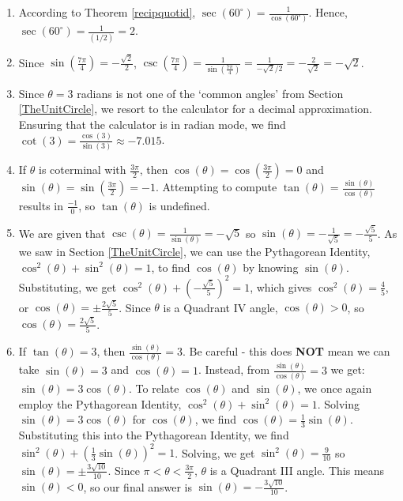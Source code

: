 {
\begin{enumerate}

\item  According to Theorem \ref{recipquotid},   $\sec\left(60^{\circ}\right) = \frac{1}{\cos\left(60^{\circ}\right)}$. Hence,  $\sec\left(60^{\circ}\right) = \frac{1}{(1/2)} = 2$.

\item  Since $\sin\left( \frac{7\pi}{4}\right) = - \frac{\sqrt{2}}{2}$,  $\csc\left( \frac{7\pi}{4}\right) = \frac{1}{\sin\left( \frac{7\pi}{4}\right)} = \frac{1}{- \sqrt{2}/2} = - \frac{2}{\sqrt{2}} = - \sqrt{2}$.

\item  Since $\theta = 3$ radians is not one of the `common angles' from Section \ref{TheUnitCircle}, we resort to the calculator for a decimal approximation.  Ensuring that the calculator is in radian mode, we find $\cot(3) = \frac{\cos(3)}{\sin(3)} \approx -7.015$.

\item  If $\theta$ is coterminal with $\frac{3 \pi}{2}$, then $\cos(\theta) = \cos\left(\frac{3 \pi}{2}\right) = 0$ and $\sin(\theta) = \sin\left(\frac{3 \pi}{2}\right) = -1$.  Attempting to compute $\tan(\theta) = \frac{\sin(\theta)}{\cos(\theta)}$ results in $\frac{-1}{0}$, so $\tan(\theta)$ is undefined.

\item  We are given that $\csc(\theta) = \frac{1}{\sin(\theta)} = -\sqrt{5}$ so $\sin(\theta) = -\frac{1}{\sqrt{5}} = -\frac{\sqrt{5}}{5}$.  As we saw in Section \ref{TheUnitCircle}, we can use the Pythagorean Identity, $\cos^{2}(\theta) + \sin^2(\theta) = 1$, to find $\cos(\theta)$ by knowing $\sin(\theta)$.  Substituting, we get $\cos^{2}(\theta) + \left(-\frac{\sqrt{5}}{5}\right)^2 = 1$, which gives $\cos^{2}(\theta) = \frac{4}{5}$, or $\cos(\theta) = \pm \frac{2 \sqrt{5}}{5}$.  Since $\theta$ is a Quadrant IV angle, $\cos(\theta) > 0$, so $\cos(\theta) = \frac{2 \sqrt{5}}{5}$.

\item \label{commontanmistake} If $\tan(\theta) = 3$, then $\frac{\sin(\theta)}{\cos(\theta)} = 3$.  Be careful - this does \textbf{NOT} mean we can take $\sin(\theta) = 3$ and $\cos(\theta) = 1$. Instead, from $\frac{\sin(\theta)}{\cos(\theta)} = 3$  we get: $\sin(\theta) = 3 \cos(\theta)$.  To relate $\cos(\theta)$ and $\sin(\theta)$, we once again employ the Pythagorean Identity, $\cos^{2}(\theta) + \sin^{2}(\theta) = 1$.  Solving $\sin(\theta) = 3 \cos(\theta)$ for $\cos(\theta)$, we find $\cos(\theta) = \frac{1}{3} \sin(\theta)$.  Substituting this into the Pythagorean Identity, we find  $\sin^{2}(\theta) + \left(\frac{1}{3} \sin(\theta)\right)^2 = 1$. Solving, we get $\sin^{2}(\theta) = \frac{9}{10}$ so $\sin(\theta) = \pm \frac{3 \sqrt{10}}{10}$.  Since $\pi < \theta < \frac{3\pi}{2}$, $\theta$ is  a Quadrant III angle.  This means $\sin(\theta) < 0$, so our final answer is  $\sin(\theta) = - \frac{3 \sqrt{10}}{10}$.

\end{enumerate}
}

